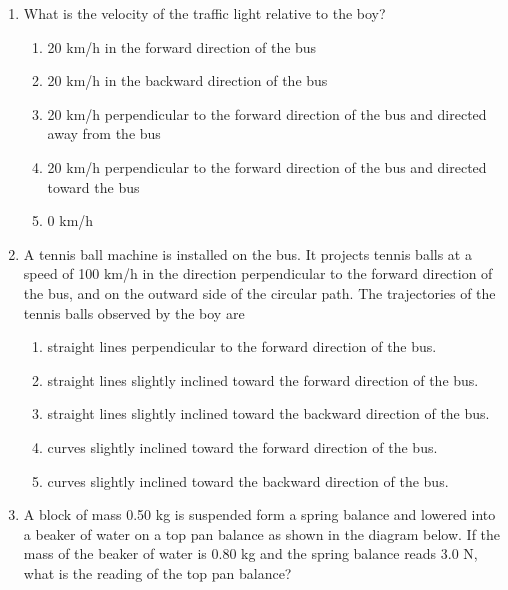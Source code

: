 \documentclass[12pt,letterpaper]{article}
\begin{document}
\begin{enumerate}[resume]
\item
What is the velocity of the traffic light relative to the boy?
\begin{enumerate}
\item 20 km/h in the forward direction of the bus
\item 20 km/h in the backward direction of the bus
\item 20 km/h perpendicular to the forward direction of the bus and directed away from the bus
\item 20 km/h perpendicular to the forward direction of the bus and directed toward the bus
\item 0 km/h
\end{enumerate}

\item
A tennis ball machine is installed on the bus. It projects tennis balls at a speed of 100 km/h in the direction perpendicular to the forward direction of the bus, and on the outward side of the circular path. The trajectories of the tennis balls observed by the boy are
\begin{enumerate}
\item straight lines perpendicular to the forward direction of the bus.
\item straight lines slightly inclined toward the forward direction of the bus.
\item straight lines slightly inclined toward the backward direction of the bus.
\item curves slightly inclined toward the forward direction of the bus.
\item curves slightly inclined toward the backward direction of the bus.
\end{enumerate}

\item
A block of mass 0.50 kg is suspended form a spring balance and lowered into a beaker of water on a top pan balance as shown in the diagram below. If the mass of the beaker of water is 0.80 kg and the spring balance reads 3.0 N, what is the reading of the top pan balance?

\begin{tabular}{l r}


\end{tabular}
\end{enumerate}
\end{document}
